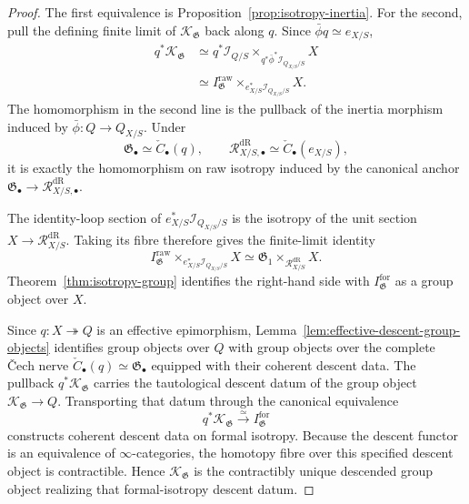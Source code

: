 \begin{proof}
The first equivalence is
Proposition~\ref{prop:isotropy-inertia}.  For the second, pull the defining
finite limit of $\mathcal K_{\mathfrak G}$ back along $q$.  Since
$\bar\phi q\simeq e_{X/S}$,
\[
\begin{aligned}
    q^*\mathcal K_{\mathfrak G}
    &\simeq
    q^*\mathcal I_{Q/S}
    \times_{q^*\bar\phi^*\mathcal I_{Q_{X/S}/S}}
    X\\
    &\simeq
    I^{\mathrm{raw}}_{\mathfrak G}
    \times_{e_{X/S}^*\mathcal I_{Q_{X/S}/S}}
    X.
\end{aligned}
\]
The homomorphism in the second line is the pullback of the inertia morphism
induced by $\bar\phi:Q\to Q_{X/S}$.  Under
\[
    \mathfrak G_\bullet\simeq\check C_\bullet(q),
    \qquad
    \mathcal R^{\mathrm{dR}}_{X/S,\bullet}\simeq\check C_\bullet(e_{X/S}),
\]
it is exactly the homomorphism on raw isotropy induced by the canonical anchor
$\mathfrak G_\bullet\to \mathcal R^{\mathrm{dR}}_{X/S,\bullet}$.

The identity-loop section of
$e_{X/S}^*\mathcal I_{Q_{X/S}/S}$ is the isotropy of the unit section
$X\to \mathcal R^{\mathrm{dR}}_{X/S}$.  Taking its fibre therefore gives the finite-limit identity
\[
    I^{\mathrm{raw}}_{\mathfrak G}
    \times_{e_{X/S}^*\mathcal I_{Q_{X/S}/S}}
    X
    \simeq
    \mathfrak G_1\times_{\mathcal R^{\mathrm{dR}}_{X/S}}X.
\]
Theorem~\ref{thm:isotropy-group} identifies the right-hand side with
$I^{\mathrm{for}}_{\mathfrak G}$ as a group object over $X$.

Since $q:X\twoheadrightarrow Q$ is an effective epimorphism,
Lemma~\ref{lem:effective-descent-group-objects} identifies group objects over
$Q$ with group objects over the complete \v{C}ech nerve
$\check C_\bullet(q)\simeq\mathfrak G_\bullet$ equipped with their coherent
descent data.  The pullback $q^*\mathcal K_{\mathfrak G}$ carries the
tautological descent datum of the group object
$\mathcal K_{\mathfrak G}\to Q$.  Transporting that datum through the
canonical equivalence
\[
    q^*\mathcal K_{\mathfrak G}
    \xrightarrow{\simeq}
    I^{\mathrm{for}}_{\mathfrak G}
\]
constructs coherent descent data on formal isotropy.  Because the descent
functor is an equivalence of $\infty$-categories, the homotopy fibre over this
specified descent object is contractible.  Hence
$\mathcal K_{\mathfrak G}$ is the contractibly unique descended group object
realizing that formal-isotropy descent datum.
\end{proof}

